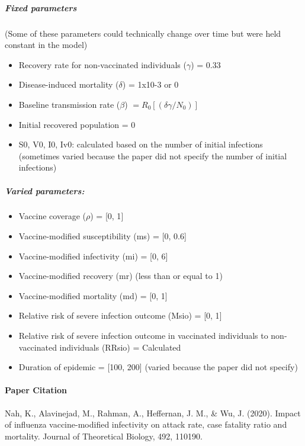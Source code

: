 \documentclass[]{article}
\providecommand{\tightlist}{%
  \setlength{\itemsep}{0pt}\setlength{\parskip}{0pt}}
\let\oldparagraph\paragraph
\renewcommand{\paragraph}[1]{\oldparagraph{#1}\mbox{}}
\let\oldsubparagraph\subparagraph
\renewcommand{\subparagraph}[1]{\oldsubparagraph{#1}\mbox{}}
\begin{document}
\hypertarget{fixed-parameters}{%
\subparagraph{Fixed parameters}\label{fixed-parameters}}

(Some of these parameters could technically change over time but were
held constant in the model)

\begin{itemize}
\tightlist
\item
  Recovery rate for non-vaccinated individuals (\(\gamma\)) = 0.33
\item
  Disease-induced mortality (\(\delta\)) = 1x10-3 or 0
\item
  Baseline transmission rate (\(\beta\)) \(= R_0[(\delta\gamma/N_0)]\)
\item
  Initial recovered population = 0
\item
  S0, V0, I0, Iv0: calculated based on the number of initial infections
  (sometimes varied because the paper did not specify the number of
  initial infections)
\end{itemize}

\hypertarget{varied-parameters}{%
\subparagraph{Varied parameters:}\label{varied-parameters}}

\begin{itemize}
\tightlist
\item
  Vaccine coverage (\(\rho\)) = {[}0, 1{]}
\item
  Vaccine-modified susceptibility (ms) = {[}0, 0.6{]}
\item
  Vaccine-modified infectivity (mi) = {[}0, 6{]}
\item
  Vaccine-modified recovery (mr) (less than or equal to 1)
\item
  Vaccine-modified mortality (md) = {[}0, 1{]}
\item
  Relative risk of severe infection outcome (Msio) = {[}0, 1{]}
\item
  Relative risk of severe infection outcome in vaccinated individuals to
  non-vaccinated individuals (RRsio) = Calculated
\item
  Duration of epidemic = {[}100, 200{]} (varied because the paper did
  not specify)
\end{itemize}

\hypertarget{paper-citation}{%
\paragraph{Paper Citation}\label{paper-citation}}

Nah, K., Alavinejad, M., Rahman, A., Heffernan, J. M., \& Wu, J. (2020).
Impact of influenza vaccine-modified infectivity on attack rate, case
fatality ratio and mortality. Journal of Theoretical Biology, 492,
110190.
\end{document}

